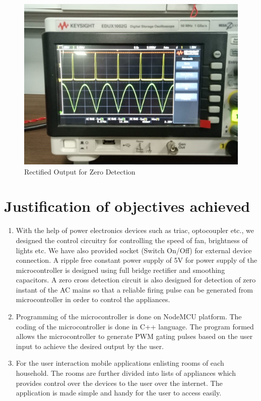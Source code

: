         \begin{figure}[h!]
        	\includegraphics[width=\textwidth]{photos/results/RectifiedOutputVoltage.jpg}
        	\caption{Rectified Output for Zero Detection}
        \end{figure}
        \section{Justification of objectives achieved}
         \begin{enumerate}
         \item With the help of power electronics devices such as triac, optocoupler etc., we designed the control circuitry for controlling the speed of fan, brightness of lights etc. We have also provided socket (Switch On/Off) for external device connection. A ripple free constant power supply of 5V for power supply of the microcontroller is designed using full bridge rectifier and smoothing capacitors. A zero cross detection circuit is also designed for detection of zero instant of the AC mains so that a reliable firing pulse can be generated from microcontroller in order to control the appliances.

\item Programming of the microcontroller is done on NodeMCU platform. The coding of the microcontroller is done in C++ language. The program formed allows the microcontroller to generate PWM gating pulses based on the user input to achieve the desired output by the user.
\item   For the user interaction mobile applications enlisting rooms of each household. The rooms are further divided into lists of appliances which provides control over the devices to the user over the internet. The application is made simple and handy for the user to access easily.


         \end{enumerate}
   